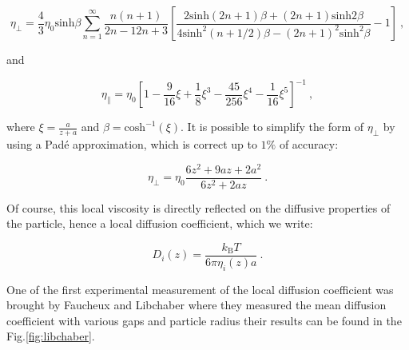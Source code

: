 \begin{equation}
	\eta_\bot = \frac{4}{3} \eta_0 \mathrm{sinh}\beta \sum _{n=1} ^{\infty} \frac{n(n+1)}{{2n-1}{2n+3}}
	\left[
	\frac
	{
		2\mathrm{sinh}(2n + 1)\beta + (2n +1)\mathrm{sinh}2\beta
	}
	{
		4\mathrm{sinh}^2(n + 1 /2)\beta  - (2n+1)^2 \mathrm{sinh}^2 \beta
	}
	-1
	\right] ~,
	\label{Eq:etaz}
\end{equation}

and 

\begin{equation}
	\eta_\parallel = \eta_0 
	\left[
		1 - \frac{9}{16} \xi + \frac{1}{8}\xi^3 - \frac{45}{256}\xi^4 - \frac{1}{16}\xi^5
	\right]^{-1}~,
	\label{Eq:etax}
\end{equation}

where $\xi = \frac{a}{z+a}$ and $\beta = \mathrm{cosh}^{-1}(\xi)$. It is possible to simplify the form of $\eta_\bot$ by using a Padé approximation, which is correct up to $1\%$ of accuracy:

\begin{equation}
	\eta_\bot = \eta_0 \frac{6z^2 + 9az + 2a^2}{6z^2 + 2az}~.
\end{equation}

Of course, this local viscosity is directly reflected on the diffusive properties of the particle, hence a local diffusion coefficient, which we write:

\begin{equation}
	D_i (z) = \frac{k_\mathrm{B} T}{6\pi\eta_i (z) a}~.
\end{equation}

One of the first experimental measurement of the local diffusion coefficient was brought by Faucheux and Libchaber \cite{faucheux_confined_1994} where they measured the mean diffusion coefficient with various gaps and particle radius their results can be found in the Fig.\ref{fig:libchaber}.

